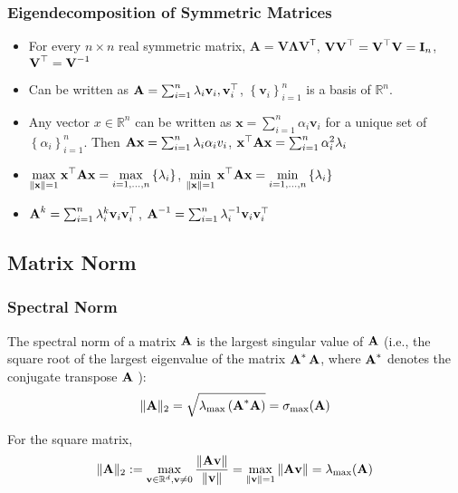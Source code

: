 \subsubsection*{Eigendecomposition of Symmetric Matrices}
\begin{itemize}[leftmargin=*]
    \item For every $n \times n$ real symmetric matrix, ${\displaystyle \mathbf {A} =\mathbf {V} \mathbf {\Lambda } \mathbf {V} ^{\mathsf {T}}}$, $\boldsymbol{\mathbf{VV}}^\top = \boldsymbol{\mathbf{V}}^\top\boldsymbol{\mathbf{V}} = \boldsymbol{\mathbf{I}}_n$, $\boldsymbol{\mathbf{V}}^\top = \boldsymbol{\mathbf{V}}^{-1}$
    \item Can be written as $\boldsymbol{\mathbf{A}}=\sum_{i=1}^{n} \lambda_{i} \mathbf{v}_{i},  \mathbf{v}_{i}^{\top}$, $\left\{\mathbf{v}_{i}\right\}_{i=1}^{n}$ is a basis of $\mathbb{R}^n$.
    \item Any vector $x \in \mathbb{R}^{n}$ can be written as $\mathbf{x}=\sum_{i=1}^{n} \alpha_{i} \mathbf{v}_{i}$ for a unique set of $\left\{\alpha_{i}\right\}_{i=1}^{n}$. Then $\boldsymbol{\mathbf{Ax}}=\sum_{i=1}^{n} \lambda_{i} \alpha_{i} v_{i}$, $\boldsymbol{\mathbf{x}}^{\top} \boldsymbol{\mathbf{Ax}}=\sum_{i=1}^{n} \alpha_{i}^{2} \lambda_{i}$
    \item $\displaystyle\max _{\| \boldsymbol{\mathbf{x}} \|=1} \boldsymbol{\mathbf{x}}^{\top} \boldsymbol{\mathbf{ A x}}=\displaystyle\max _{i=1, \dots,  n}\left\{\lambda_{i}\right\}$, $\displaystyle\min _{\| \boldsymbol{\mathbf{x}} \|=1} \boldsymbol{\mathbf{x}}^{\top} \boldsymbol{\mathbf{A x}}=\displaystyle\min _{i=1, \dots, n }\left\{\lambda_{i}\right\}$
    \item $\boldsymbol{\mathbf{A}}^{k}=\sum_{i=1}^{n} \lambda_{i}^{k} \mathbf{v}_{i} \mathbf{v}_{i}^{\top}$, $\boldsymbol{\mathbf{A}}^{-1}=\sum_{i=1}^{n} \lambda_{i}^{-1} \boldsymbol{\mathbf{v}}_{i} \mathbf{v}_{i}^{\top}$
\end{itemize}


\subsection*{Matrix Norm}
\subsubsection*{Spectral Norm}
The spectral norm of a matrix $\boldsymbol{\mathbf{A}}$ is the largest singular value of $\boldsymbol{\mathbf{A}}$ (i.e., the square root of the largest eigenvalue of the matrix $\boldsymbol{\mathbf{A}}^{*} \operatorname{\boldsymbol{\mathbf{A}}}$, where $\boldsymbol{\mathbf{A}}^{*}$ denotes the conjugate transpose $\boldsymbol{\mathbf{A}}$ ):
$$
\|\boldsymbol{\mathbf{A}}\|_{2}=\sqrt{\lambda_{\max }\left(\boldsymbol{\mathbf{A}}^{*} \boldsymbol{\mathbf{A}}\right)}=\sigma_{\max }(\boldsymbol{\mathbf{A}})
$$


For the square matrix,
$$\|\boldsymbol{\mathbf{A}} \|_2:=\max _{\mathbf{v} \in \mathbb{R}^{d}, \mathbf{v} \neq 0} \frac{\|\boldsymbol{\mathbf{A}} \mathbf{v}\|}{\|\mathbf{v}\|}=\max _{\|\mathbf{v}\|=1}\|\boldsymbol{\mathbf{A}}  \mathbf{v}\| = \lambda_{\max} (\boldsymbol{\mathbf{A}})$$


